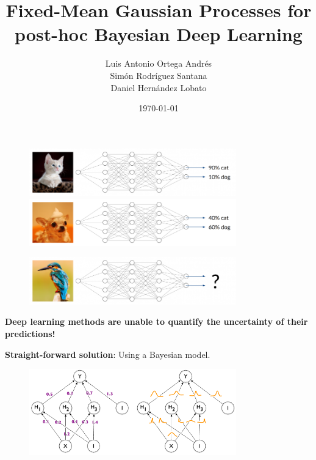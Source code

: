 \documentclass[aspectratio=149]{beamer}
\title{Fixed-Mean Gaussian Processes for post-hoc Bayesian Deep Learning}
\date{\today}
\author{Luis Antonio Ortega Andrés\\
Simón Rodríguez Santana\\
Daniel Hernández Lobato\\}
\institute{Autonomous University of Madrid}
\begin{document}
  \maketitle


    {
      \begin{frame}{}
        \begin{figure}
            \centering
            \includegraphics[width = 0.8\textwidth]{slides_imgs/Bildschirmfoto-vom-2019-10-01-11-03-08-768x175.png}
            \includegraphics[width = 0.8\textwidth]{slides_imgs/uncertainty-quantification-dog-768x175.png}
        \end{figure}
    \end{frame}}
    
    {
      \begin{frame}{}
        \begin{figure}
            \centering
            \includegraphics[width = 0.8\textwidth]{slides_imgs/Bildschirmfoto-vom-2019-10-01-11-03-18-768x175.png}
        \end{figure}
        \pause
        \begin{center}
        \textbf{Deep learning methods are unable to quantify the uncertainty of their predictions!}
        \end{center}
    \end{frame}}
    
    {
      \begin{frame}{}
      \textbf{Straight-forward solution}: Using a Bayesian model.
        \begin{figure}
            \centering
            \includegraphics[width = 0.8\textwidth]{slides_imgs/Bayesian-Neural-Network.png}
        \end{figure}
    \end{frame}}
\end{document}
